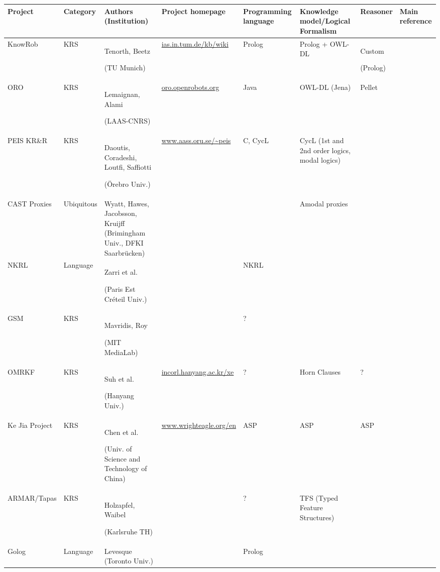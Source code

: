 \documentclass[a4paper, twocolumn]{article}
\begin{document}
\begin{landscape}
\begin{table}\footnotesize
\begin{center}

\begin{tabular}{p{2.2cm}p{1.6cm}p{4cm}lp{2.4cm}p{3.4cm}p{2.8cm}p{1.5cm}}
\toprule
{\bf Project} & {\bf Category} & {\bf Authors (Institution)} & {\bf Project homepage} & {\bf Programming language} & {\bf Knowledge model/Logical Formalism} & {\bf Reasoner} & Main reference \\
\midrule
{\sc KnowRob} & KRS & Tenorth, Beetz \par (TU Munich) & \url{ias.in.tum.de/kb/wiki} & {\sc Prolog} & {\sc Prolog} + OWL-DL & Custom \par ({\sc Prolog}) & \cite{Tenorth2009a} \\
ORO & KRS & Lemaignan, Alami \par (LAAS-CNRS) & \url{oro.openrobots.org} & {\sc Java} & OWL-DL ({\sc Jena}) & {\sc Pellet} & \cite{Lemaignan2010} \\
PEIS KR\&R & KRS & Daoutis, Coradeshi, Loutfi, Saffiotti \par (Örebro Univ.) & \url{www.aass.oru.se/~peis} & {\sc C}, {\sc CycL} & CycL (1st and 2nd order logics, modal logics) & & \cite{Daoutis2009} \\
CAST Proxies & Ubiquitous & Wyatt, Hawes, Jacobsson, Kruijff (Brimingham Univ., DFKI Saarbrücken) & & & Amodal proxies & & \cite{Jacobsson2008} \\
NKRL & Language & Zarri et al. \par (Paris Est Créteil Univ.) & & NKRL & & & \cite{Sabri2011} \\
GSM & KRS & Mavridis, Roy \par (MIT MediaLab) & & ? & & & \cite{Mavridis2006} \\
OMRKF & KRS & Suh et al. \par (Hanyang Univ.) & \url{incorl.hanyang.ac.kr/xe} & ? & Horn Clauses & ? & \cite{Suh2007} \\
Ke Jia Project & KRS & Chen et al. \par (Univ. of Science and Technology of China) & \url{www.wrighteagle.org/en} & ASP & ASP & ASP & \cite{Chen2010} \\
ARMAR/Tapas & KRS & Holzapfel, Waibel \par (Karlsruhe TH) & & ? & TFS (Typed Feature Structures) & & \cite{Holzapfel2008}\\
Golog & Language & Levesque (Toronto Univ.) & & {\sc Prolog} & & & \\

\end{tabular}
\end{center}
\end{table}
\end{landscape}
\end{document}
